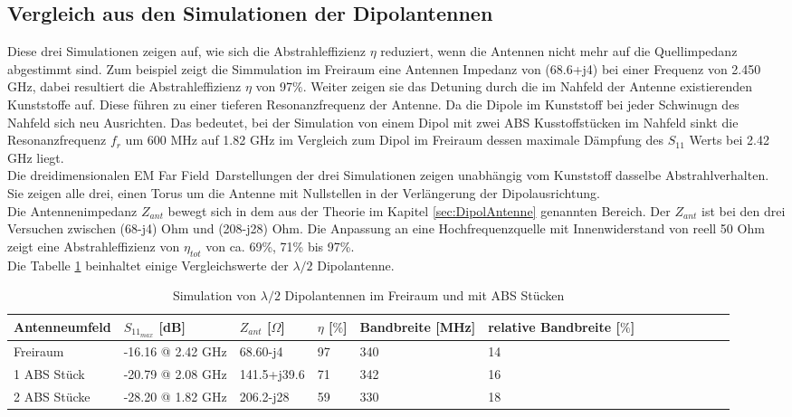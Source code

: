 \subsection{Vergleich aus den Simulationen der Dipolantennen}
Diese drei Simulationen zeigen auf, wie sich die Abstrahleffizienz $\eta$ reduziert, wenn die Antennen nicht mehr auf die Quellimpedanz abgestimmt sind. Zum beispiel zeigt die Simmulation im Freiraum eine Antennen Impedanz von (68.6+j4) bei einer Frequenz von 2.450 GHz, dabei resultiert die Abstrahleffizienz $\eta$ von 97$\%$. Weiter zeigen sie das Detuning durch die im Nahfeld der Antenne existierenden Kunststoffe auf. Diese führen zu einer tieferen Resonanzfrequenz der Antenne. Da die Dipole im Kunststoff bei jeder Schwinugn des Nahfeld sich neu Ausrichten. Das bedeutet, bei der Simulation von einem Dipol mit zwei ABS Kusstoffstücken im Nahfeld sinkt die Resonanzfrequenz $f_{r}$ um 600 MHz auf 1.82 GHz im Vergleich zum Dipol im Freiraum dessen maximale Dämpfung des $S_{11}$ Werts bei 2.42 GHz liegt.\\ 
Die dreidimensionalen \glqq EM Far Field\grqq \  Darstellungen der drei Simulationen zeigen unabhängig vom Kunststoff dasselbe Abstrahlverhalten. Sie zeigen alle drei, einen Torus um die Antenne mit Nullstellen in der Verlängerung der Dipolausrichtung.\\
Die Antennenimpedanz $Z_{ant}$ bewegt sich in dem aus der Theorie im Kapitel \ref{sec:DipolAntenne} genannten Bereich. Der $Z_{ant}$ ist bei den drei Versuchen zwischen (68-j4) Ohm und  (208-j28) Ohm. Die Anpassung an eine Hochfrequenzquelle mit Innenwiderstand von reell 50 Ohm  zeigt eine Abstrahleffizienz von $\eta_{tot}$ von   ca. 69\%, 71\%  bis 97\%.\\
Die Tabelle \ref{tab:Evaluation_Vergeich_Dipolantennen} beinhaltet einige Vergleichswerte der $\lambda/2$ Dipolantenne.
\begin{table}[!h]
  \centering
  \begin{tabular}{p{3cm} p{4cm} p{2cm} p{1.5cm} p{2cm} p{2.5cm}  l  c c c c p r} 
  \toprule 
  Antenneumfeld             & $S_{11_{max}}$ [dB]		& $Z_{ant}$ [$\Omega$] 	& $\eta$ [$\%$] & Bandbreite [MHz] & relative Bandbreite  [$\%$]\\ 
  \midrule
 Freiraum    			&	-16.16 @ 2.42 GHz		&  	68.60-j4			&   	97	&	340 & 14\\         		
1 ABS Stück  	&   -20.79 @ 2.08 GHz 		&	141.5+j39.6		&	71	&	342	 & 16 \\
2 ABS Stücke  	&   -28.20 @ 1.82 GHz   	&	206.2-j28		&	59	&	330	 & 18 \\
 \bottomrule
  \end{tabular}
  \caption{Simulation von $\lambda/2$ Dipolantennen im Freiraum und mit ABS Stücken}
  \label{tab:Evaluation_Vergeich_Dipolantennen}
\end{table}

